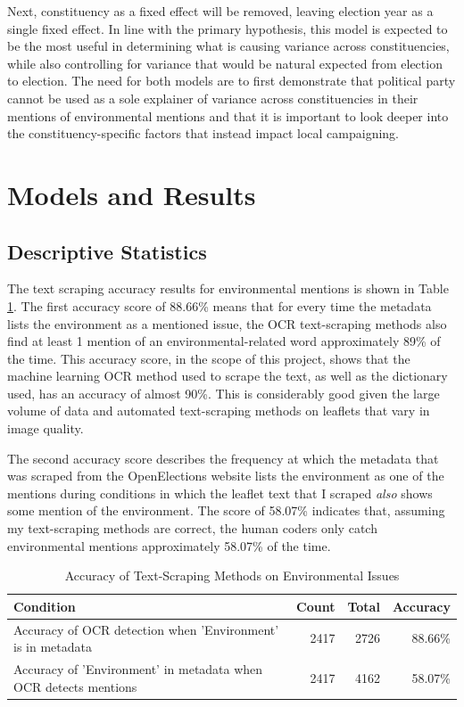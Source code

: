 \documentclass[preprint]{elsarticle} %
\begin{document}
Next, constituency as a fixed effect will be removed, leaving election year as a single fixed effect. In line with the primary hypothesis, this model is expected to be the most useful in determining what is causing variance across constituencies, while also controlling for variance that would be natural expected from election to election. The need for both models are to first demonstrate that political party cannot be used as a sole explainer of variance across constituencies in their mentions of environmental mentions and that it is important to look deeper into the constituency-specific factors that instead impact local campaigning.
	
\newpage

\section{Models and Results}


\subsection{Descriptive Statistics}


The text scraping accuracy results for environmental mentions is shown in Table~ \ref{tab:envaccuracy}. The first accuracy score of 88.66\% means that for every time the metadata lists the environment as a mentioned issue, the OCR text-scraping methods also find at least 1 mention of an environmental-related word approximately 89\% of the time. This accuracy score, in the scope of this project, shows that the machine learning OCR method used to scrape the text, as well as the dictionary used, has an accuracy of almost 90\%. This is considerably good given the large volume of data and automated text-scraping methods on leaflets that vary in image quality.

The second accuracy score describes the frequency at which the metadata that was scraped from the OpenElections website lists the environment as one of the mentions during conditions in which the leaflet text that I scraped \textit{also} shows some mention of the environment. The score of 58.07\% indicates that, assuming my text-scraping methods are correct, the human coders only catch environmental mentions approximately 58.07\% of the time. 




\vspace{0.5cm}


\begin{table}[!htbp]  
	\caption{Accuracy of Text-Scraping Methods on Environmental Issues} 
	\label{tab:envaccuracy} 
	\begin{tabular}{|l|r|r|r|}
		\hline
		Condition & Count & Total & Accuracy \\ 
		\hline
		Accuracy of OCR detection when 'Environment' is in metadata & 2417 & 2726 & 88.66\% \\
		Accuracy of 'Environment' in metadata when OCR detects mentions & 2417 & 4162 & 58.07\% \\
		\hline
	\end{tabular}
\end{table}
\end{document}
